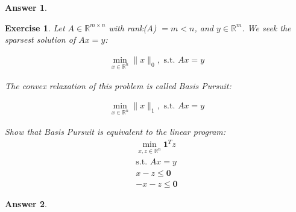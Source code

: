 \documentclass[12pt]{article}
\theoremstyle{colon}
\newtheorem{exercise}{Exercise}
\newtheorem*{answer}{Answer}
\begin{document}
\begin{answer}

\end{answer}

\clearpage

\begin{exercise}
  Let $A \in \mathbb{R}^{m \times n}$ with rank($A$) $= m < n$, and $y \in \mathbb{R}^m$. We seek the sparsest solution of $Ax = y$:

  \begin{gather*}
    \min_{x \in \mathbb{R}^n} \lVert x \rVert_0, \text{ s.t. } Ax = y
  \end{gather*}

  The convex relaxation of this problem is called Basis Pursuit:

  \begin{gather*}
    \min_{x \in \mathbb{R}^n} \lVert x \rVert_1, \text{ s.t. } Ax = y
  \end{gather*}

  Show that Basis Pursuit is equivalent to the linear program:
  \begin{gather*}
    \min_{x, z \in \mathbb{R}^n} \bm{1}^T z\\
    \text{s.t. } Ax = y \\
    x - z \leq \bm{0} \\
    -x - z \leq \bm{0}
  \end{gather*}
\end{exercise}

\begin{answer}

\end{answer}

\clearpage
\end{document}
